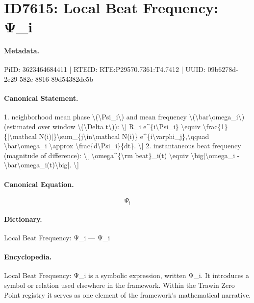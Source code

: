 \section*{ID7615: Local Beat Frequency: Ψ\_i}
\paragraph{Metadata.}
PiID: 3623464684411 | RTEID: RTE:P29570.7361:T4.7412 | UUID: 09b6278d-2e29-582e-8816-89d54382dc5b

\paragraph{Canonical Statement.}
1. neighborhood mean phase \textbackslash{}(\textbackslash{}Psi\_i\textbackslash{}) and mean frequency \textbackslash{}(\textbackslash{}bar\textbackslash{}omega\_i\textbackslash{}) (estimated over window \textbackslash{}(\textbackslash{}Delta t\textbackslash{})): \textbackslash{}[ R\_i e\textasciicircum{}\{i\textbackslash{}Psi\_i\} \textbackslash{}equiv \textbackslash{}frac\{1\}\{|\textbackslash{}mathcal N(i)|\}\textbackslash{}sum\_\{j\textbackslash{}in\textbackslash{}mathcal N(i)\} e\textasciicircum{}\{i\textbackslash{}varphi\_j\},\textbackslash{}qquad \textbackslash{}bar\textbackslash{}omega\_i \textbackslash{}approx \textbackslash{}frac\{d\textbackslash{}Psi\_i\}\{dt\}. \textbackslash{}] 2. instantaneous beat frequency (magnitude of difference): \textbackslash{}[ \textbackslash{}omega\textasciicircum{}\{\textbackslash{}rm beat\}\_i(t) \textbackslash{}equiv \textbackslash{}big|\textbackslash{}omega\_i - \textbackslash{}bar\textbackslash{}omega\_i(t)\textbackslash{}big|. \textbackslash{}]

\paragraph{Canonical Equation.}
\[
\Psi_i
\]

\paragraph{Dictionary.}
Local Beat Frequency: Ψ\_i — Ψ\_i

\paragraph{Encyclopedia.}
Local Beat Frequency: Ψ\_i is a symbolic expression, written Ψ\_i. It introduces a symbol or relation used elsewhere in the framework. Within the Trawin Zero Point registry it serves as one element of the framework's mathematical narrative.
